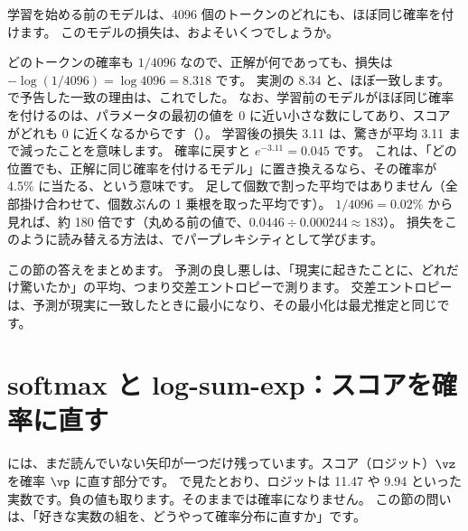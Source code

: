 \begin{quiz}
学習を始める前のモデルは、4096 個のトークンのどれにも、ほぼ同じ確率を付けます。
このモデルの損失は、およそいくつでしょうか。
\end{quiz}

どのトークンの確率も $1/4096$ なので、正解が何であっても、損失は $-\log(1/4096)=\log 4096=8.318$ です。
実測の 8.34 と、ほぼ一致します。で予告した一致の理由は、これでした。
なお、学習前のモデルがほぼ同じ確率を付けるのは、パラメータの最初の値を 0 に近い小さな数にしてあり、スコアがどれも 0 に近くなるからです（）。
学習後の損失 3.11 は、驚きが平均 3.11 まで減ったことを意味します。
確率に戻すと $e^{-3.11}=0.045$ です。
これは、「どの位置でも、正解に同じ確率を付けるモデル」に置き換えるなら、その確率が 4.5\% に当たる、という意味です。
足して個数で割った平均ではありません（全部掛け合わせて、個数ぶんの 1 乗根を取った平均です）。
$1/4096=0.02\%$ から見れば、約 180 倍です（丸める前の値で、$0.0446\div 0.000244\approx 183$）。
損失をこのように読み替える方法は、でパープレキシティとして学びます。

この節の答えをまとめます。
予測の良し悪しは、「現実に起きたことに、どれだけ驚いたか」の平均、つまり交差エントロピーで測ります。
交差エントロピーは、予測が現実に一致したときに最小になり、その最小化は最尤推定と同じです。

\section{softmax と log-sum-exp：スコアを確率に直す}\label{sec:math-softmax}

には、まだ読んでいない矢印が一つだけ残っています。スコア（ロジット）$\vz$ を確率 $\vp$ に直す部分です。
で見たとおり、ロジットは 11.47 や 9.94 といった実数です。負の値も取ります。そのままでは確率になりません。
この節の問いは、「好きな実数の組を、どうやって確率分布に直すか」です。

